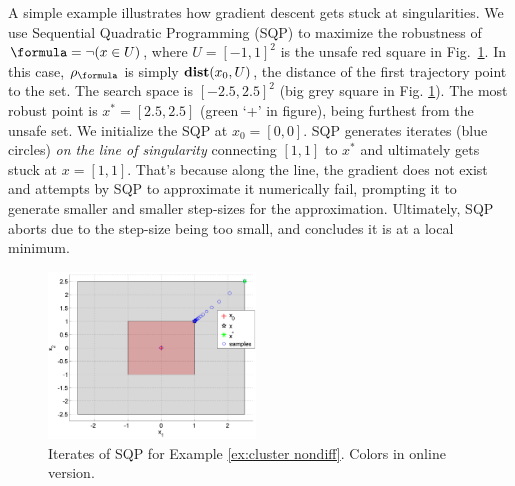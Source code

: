 \begin{exmp}
	\label{ex:cluster nondiff}
	A simple example illustrates how gradient descent gets stuck at singularities.
	We use Sequential Quadratic Programming (SQP) \cite{Polak97_Optim} to maximize the robustness of $\formula = \neg (x \in U)$, where $U=[-1,1]^2$ is the unsafe red square in Fig.~\ref{fig:DumbExample}.
	In this case, $\robf$ is simply $\mathbf{dist}(x_0,U)$, the distance of the first trajectory point to the set.
	The search space is $[-2.5,2.5]^2$ (big grey square in Fig. \ref{fig:DumbExample}). 
	The most robust point is $x^* = [2.5,2.5]$ (green `+' in figure), being furthest from the unsafe set.
	We initialize the SQP at $x_0=[0,0]$. 
	SQP generates iterates (blue circles) \textit{on the line of singularity} connecting $[1,1]$ to $x^*$ and ultimately gets stuck at $x=[1,1]$.
	That's because along the line, the gradient does not exist and attempts by SQP to approximate it numerically fail, prompting it to generate smaller and smaller step-sizes for the approximation.
	Ultimately, SQP aborts due to the step-size being too small, and concludes it is at a local minimum.
	
\begin{figure}[t]
\centering
\includegraphics[width=0.49\textwidth]{figures/DumbOptEx_scissored}
\vspace{-20pt}
\caption{{\small Iterates of SQP for Example \ref{ex:cluster nondiff}. Colors in online version.}}
\vspace{-10pt}
\label{fig:DumbExample}
\end{figure}

\end{exmp}
